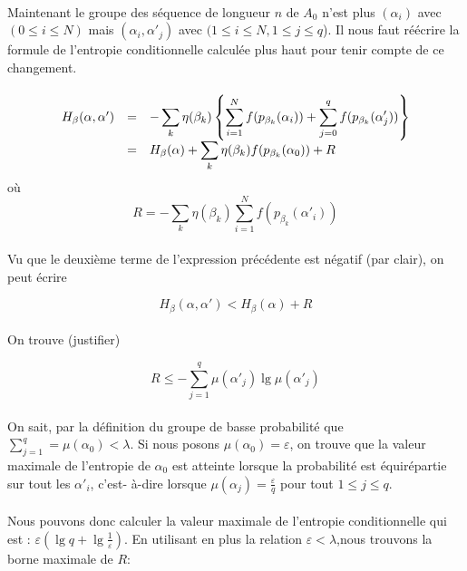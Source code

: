 	\paragraph{}
	Maintenant le groupe des séquence de longueur $n$ de $A_0$ n'est plus $(\alpha_i)$ avec $(0 \le i \le N)$ mais $(\alpha_i, \alpha'_j)$ avec $(1\le i \le N, 1 \le j \le q$).
	Il nous faut réécrire la formule de l'entropie conditionnelle calculée plus haut pour tenir compte de ce changement.
	
	\paragraph{}
	\[
		\begin{array}{r c >{\displaystyle}l}
			H_\beta(\alpha,\alpha') &=& - \sum_k\eta(\beta_k)\left\{\sum_{i=1}^Nf(p_{\beta_k}(\alpha_i))+\sum_{j=0}^qf(p_{\beta_k}(\alpha'_j))\right\}\\
			&=& H_\beta(\alpha) + \sum_k\eta(\beta_k)f(p_{\beta_k}(\alpha_0))+R
		\end{array}
	\]
	où
	\[R=- \sum_k\eta(\beta_k)\sum_{i=1}^Nf(p_{\beta_k}(\alpha'_i))\]
	
	\paragraph{}
	Vu que le deuxième terme de l'expression précédente est négatif (par clair), on peut écrire
	
	\[H_\beta(\alpha,\alpha') < H_\beta(\alpha) + R\]
	
	\paragraph{}
	On trouve (justifier)
	
	\[R \le -\sum_{j=1}^q\mu(\alpha'_j)\lg\mu(\alpha'_j)\]
	
	\paragraph{}
	On sait, par la définition du groupe de basse probabilité que $\sum_{j=1}^q =\mu(\alpha_0) < \lambda$. Si nous posons $\mu(\alpha_0)=\varepsilon$,
	on trouve que la valeur maximale de l'entropie de $\alpha_0$ est atteinte lorsque la probabilité est équirépartie sur tout les $\alpha'_i$, c'est-
	à-dire lorsque $\mu(\alpha_j)=\frac{\varepsilon}{q}$ pour tout $1\le j\le q$.
	
	\paragraph{}
	Nous pouvons donc calculer la valeur maximale de l'entropie conditionnelle qui est : $\varepsilon \left(\lg q+\lg\frac{1}{\varepsilon}\right)$.
	En utilisant en plus la relation $\varepsilon < \lambda$,nous trouvons la borne maximale de $R$:
	
